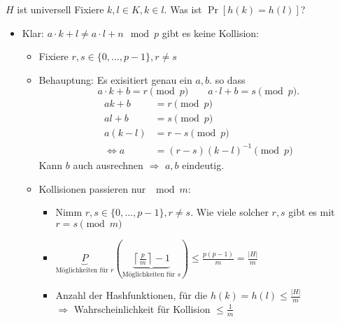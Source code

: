 \Satz $H$ ist universell
\Bew Fixiere $k, l \in K, k \in l$. Was ist $\operatorname{Pr}[h(k) = h(l)]$?
\begin{itemize}
 \item Klar: $a \cdot k + l \neq a \cdot l + n \mod p$ gibt es keine Kollision:
     \begin{itemize}
     \item Fixiere $r,s \in \{0, ..., p-1\}, r \neq s$
     \item Behauptung: Es exisitiert genau ein $a, b$. so dass 
         \[a \cdot k + b = r \pmod{p} \qquad a \cdot l + b = s \pmod{p}.\]
         \Bew
             \begin{align*}
              a k + b &= r \pmod{p}\\
              a l + b &= s \pmod{p}\\\hline
              a (k - l) &= r - s \pmod{p} \\
\Leftrightarrow      a  &= (r-s)(k-l)^{-1} \pmod{p} 
             \end{align*}
             Kann $b$ auch ausrechnen $\Rightarrow$ $a, b$ eindeutig.
     \item Kollisionen passieren nur $\mod m$:
             \begin{itemize}
             \item Nimm $r, s \in \{0, ..., p-1\}, r \neq s$. Wie viele solcher $r, s$ gibt es mit $r = s \pmod{m}$
             \item $\underbrace{P}_{\text{Möglichkeiten für $r$}} (\underbrace{\left\lceil\frac{p}{m}\right\rceil - 1}_{\text{Möglichkeiten für $s$}}) \leq \frac{p(p-1)}{m} = \frac{|H|}{m}$
             \item Anzahl der Hashfunktionen, für die $h(k) = h(l) \leq \frac{|H|}{m}$ \\
                 $\Rightarrow$ Wahrscheinlichkeit für Kollision $\leq \frac{1}{m}$
             \end{itemize}
     \end{itemize}
\end{itemize}


